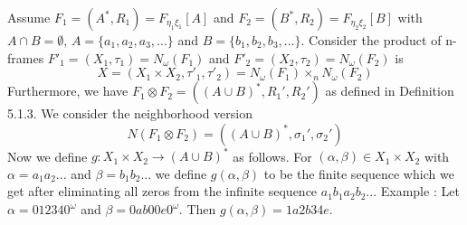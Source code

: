 \documentclass[12pt, a4paper]{scrartcl}
\begin{document}
    Assume $F_1 = (A^*,R_1) = F_{\eta_1 \xi_1}[A]$ and $F_2 = (B^*,R_2) = F_{\eta_2 \xi_2}[B]$ 
    with $A \cap B = \emptyset$, $A = \{a_1,a_2,a_3,...\}$ and $B = \{b_1,b_2,b_3,...\}$. 
    Consider the product of n-frames $F'_1 = (X_1, \tau_1) = N_\omega(F_1)$ and $F'_2 = (X_2, \tau_2) = N_\omega(F_2)$ is 
    $$X = (X_1 \times X_2, \tau'_1, \tau'_2) = N_\omega(F_1) \times_n N_\omega(F_2)$$ \newline
    Furthermore, we have $F_1 \otimes F_2 = ((A \cup B)^*, R_1', R_2')$ as defined in Definition 5.1.3.
    We consider the neighborhood version $$N(F_1 \otimes F_2) = ((A \cup B)^*, \sigma_1', \sigma_2')$$ \newline
    Now we define $g : X_1 \times X_2 \rightarrow (A \cup B)^*$ as follows. For $(\alpha, \beta) \in X_1 \times X_2$ with $\alpha = a_1a_2...$ and $\beta = b_1b_2...$
    we define $g(\alpha,\beta)$ to be the finite sequence which we get after eliminating all zeros from the infinite sequence
    $a_1b_1a_2b_2...$ \newline \newline
    Example : Let $\alpha = 012340^\omega$  and $\beta = 0ab00e0^\omega$. Then $g(\alpha, \beta) = 1a2b34e$.
\end{document}

